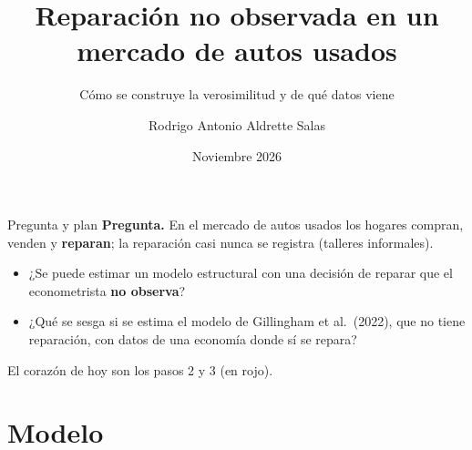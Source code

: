 \documentclass[aspectratio=169,11pt]{beamer}
\title{Reparación no observada en un mercado de autos usados}
\subtitle{Cómo se construye la verosimilitud y de qué datos viene}
\author{Rodrigo Antonio Aldrette Salas}
\institute{El Colegio de México \\ Seminario de tesis}
\date{Noviembre 2026}
\newcommand{\idea}[1]{\vspace{-0.3em}\begin{block}{}\centering\small #1\end{block}}
\begin{document}
\begin{frame}
  \titlepage
\end{frame}

\begin{frame}{Pregunta y plan}
  \textbf{Pregunta.} En el mercado de autos usados los hogares compran, venden y
  \textbf{reparan}; la reparación casi nunca se registra (talleres informales).
  \begin{itemize}
    \item ¿Se puede estimar un modelo estructural con una decisión de reparar que el
          econometrista \textbf{no observa}?
    \item ¿Qué se sesga si se estima el modelo de Gillingham et al.\ (2022), que no tiene
          reparación, con datos de una economía donde sí se repara?
  \end{itemize}
  \medskip
  \centering
  \idea{El corazón de hoy son los pasos 2 y 3 (en rojo).}
\end{frame}

\section{Modelo}
\end{document}
